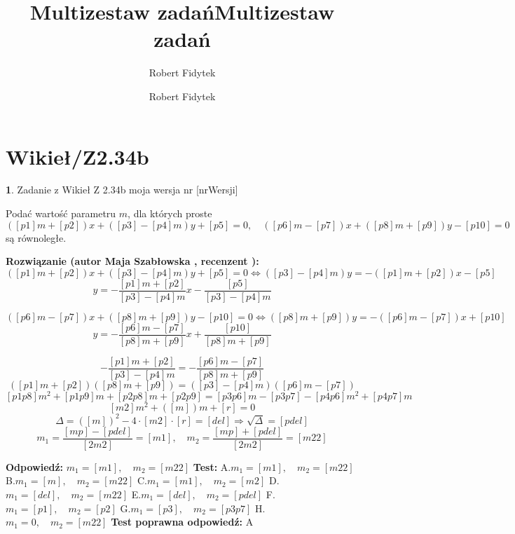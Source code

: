\documentclass[12pt, a4paper]{article}
\title{Multizestaw zadań}
\author{Robert Fidytek}
\date{}\documentclass[12pt, a4paper]{article}
\title{Multizestaw zadań}
\author{Robert Fidytek}
\date{}
\theoremstyle{definition} %
\newtheorem{zad}{}
\theoremstyle{definition} %
\newtheorem{zad}{}
\newcommand{\kategoria}[1]{\section{#1}} %
\newcommand{\zadStart}[1]{\begin{zad}#1\newline} %
\newcommand{\zadStop}{\end{zad}}   %
\newcommand{\rozwStart}[2]{\noindent \textbf{Rozwiązanie (autor #1 , recenzent #2): }\newline} %
\newcommand{\rozwStop}{\newline}                                            %
\newcommand{\odpStart}{\noindent \textbf{Odpowiedź:}\newline}    %
\newcommand{\odpStop}{\newline}                                             %
\newcommand{\testStart}{\noindent \textbf{Test:}\newline} %
\newcommand{\testStop}{\newline} %
\newcommand{\kluczStart}{\noindent \textbf{Test poprawna odpowiedź:}\newline} %
\newcommand{\kluczStop}{\newline} %
\begin{document}
\maketitle


\kategoria{Wikieł/Z2.34b}
\zadStart{Zadanie z Wikieł Z 2.34b  moja wersja nr [nrWersji]}

Podać wartość parametru $m$, dla których proste 
$$([p1]m+[p2])x+([p3]-[p4]m)y+[p5]=0, \quad ([p6]m-[p7])x+([p8]m+[p9])y-[p10]=0 $$są równoległe.
\zadStop

\rozwStart{Maja Szabłowska}{}
$$([p1]m+[p2])x+([p3]-[p4]m)y+[p5]=0 \iff ([p3]-[p4]m)y=-([p1]m+[p2])x-[p5]$$
$$y=-\frac{[p1]m+[p2]}{[p3]-[p4]m}x-\frac{[p5]}{[p3]-[p4]m}$$

$$([p6]m-[p7])x+([p8]m+[p9])y-[p10]=0 \iff ([p8]m+[p9])y=-([p6]m-[p7])x+[p10]$$
$$y=-\frac{[p6]m-[p7]}{[p8]m+[p9]}x+\frac{[p10]}{[p8]m+[p9]}$$

$$-\frac{[p1]m+[p2]}{[p3]-[p4]m}=-\frac{[p6]m-[p7]}{[p8]m+[p9]}$$
$$([p1]m+[p2])([p8]m+[p9])=([p3]-[p4]m)([p6]m-[p7])$$
$$[p1p8]m^{2}+[p1p9]m+[p2p8]m+[p2p9]=[p3p6]m-[p3p7]-[p4p6]m^{2}+[p4p7]m$$
$$[m2]m^{2}+([m])m+[r]=0$$
$$\Delta=([m])^{2}-4\cdot[m2]\cdot[r]=[del] \Rightarrow \sqrt{\Delta}=[pdel]$$
$$m_{1}=\frac{[mp]-[pdel]}{[2m2]}=[m1], \quad m_{2}=\frac{[mp]+[pdel]}{[2m2]}=[m22]$$
\rozwStop


\odpStart
$m_{1}=[m1], \quad m_{2}=[m22]$
\odpStop
\testStart
A.$m_{1}=[m1], \quad m_{2}=[m22]$
B.$m_{1}=[m], \quad m_{2}=[m22]$
C.$m_{1}=[m1], \quad m_{2}=[m2]$
D.$m_{1}=[del], \quad m_{2}=[m22]$
E.$m_{1}=[del], \quad m_{2}=[pdel]$
F.$m_{1}=[p1], \quad m_{2}=[p2]$
G.$m_{1}=[p3], \quad m_{2}=[p3p7]$
H.$m_{1}=0, \quad m_{2}=[m22]$
\testStop
\kluczStart
A
\kluczStop
\end{document}
